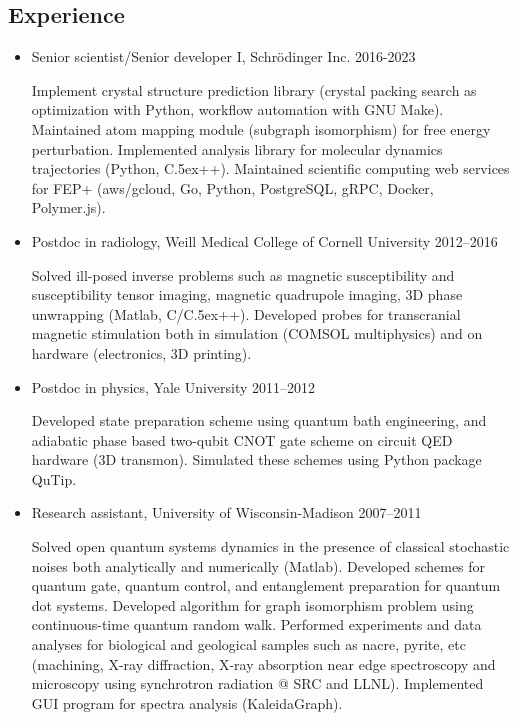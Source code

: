 \documentclass[centered,11pt,overlapped]{res}
\def\Cplusplus{{\rm C\raise.5ex\hbox{\small ++}}}
\begin{document}
\begin{resume}
\section{\sc Experience}

\begin{itemize}[leftmargin=-0.02in]
\item Senior scientist/Senior developer I, Schr\"odinger Inc. \hfill 2016-2023

Implement crystal structure prediction library (crystal packing search as optimization with Python, workflow automation with GNU Make).
Maintained atom mapping module (subgraph isomorphism) for free energy perturbation.
Implemented analysis library for molecular dynamics trajectories (Python, \Cplusplus).
Maintained scientific computing web services for FEP+ (aws/gcloud, Go, Python, PostgreSQL, gRPC, Docker, Polymer.js).

\item Postdoc in radiology, Weill Medical College of Cornell University \hfill 2012--2016

Solved ill-posed inverse problems such as magnetic susceptibility and
susceptibility tensor imaging, magnetic quadrupole imaging, 3D phase unwrapping
(Matlab, C/\Cplusplus).
Developed probes for transcranial magnetic stimulation both in simulation (COMSOL multiphysics)
and on hardware (electronics, 3D printing).

\item Postdoc in physics, Yale University \hfill 2011--2012

Developed state preparation scheme using quantum bath engineering, and adiabatic
phase based two-qubit CNOT gate scheme on circuit QED hardware (3D transmon).
Simulated these schemes using Python package QuTip.

\item {Research assistant, University of Wisconsin-Madison} \hfill {2007--2011}

Solved open quantum systems dynamics in the presence of classical stochastic noises
both analytically and numerically (Matlab).
Developed schemes for quantum gate, quantum control, and entanglement preparation
for quantum dot systems.
Developed algorithm for graph isomorphism problem using continuous-time quantum random walk.
Performed experiments and data analyses for biological and geological samples such as nacre, pyrite, etc
(machining, X-ray diffraction, X-ray absorption near edge spectroscopy and
microscopy using synchrotron radiation @ SRC and LLNL).
Implemented GUI program for spectra analysis (KaleidaGraph).


\end{itemize}
\end{resume}
\end{document}

